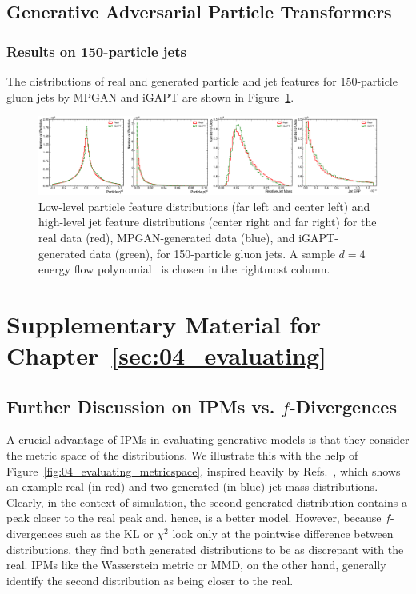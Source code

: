 \clearpage
\section{Generative Adversarial Particle Transformers}

\subsection{Results on 150-particle jets}
\label{app:04_gapt_150}

The distributions of real and generated particle and jet features for 150-particle gluon jets by MPGAN and iGAPT are shown in Figure~\ref{fig:04_gapt_feature_distributions_150}.

\begin{figure}[ht]
    \centering
    \includegraphics[width=\textwidth]{figures/04-ML4Sim/igapt/feature_distributions_150.pdf}
    \caption[Low-level particle feature distributions and high-level jet feature distributions for 150-particle gluon jets.]{Low-level particle feature distributions (far left and center left) and high-level jet feature distributions (center right and far right) for the real data (red), MPGAN-generated data (blue), and iGAPT-generated data (green), for 150-particle gluon jets.
    A sample $d = 4$ energy flow polynomial~\cite{Komiske:2017aww} is chosen in the rightmost column.
    }
    \label{fig:04_gapt_feature_distributions_150}
\end{figure}


\chapter{Supplementary Material for Chapter~\ref{sec:04_evaluating}}

\section{Further Discussion on IPMs vs. \texorpdfstring{$f$}{f}-Divergences}
\label{app:04_evaluating_metricspace}

A crucial advantage of IPMs in evaluating generative models is that they consider the metric space of the distributions.
We illustrate this with the help of Figure~\ref{fig:04_evaluating_metricspace}, inspired heavily by Refs.~\cite{gretton_talk, w1_stackoverflow}, which shows an example real (in red) and two generated (in blue) jet mass distributions.
Clearly, in the context of simulation, the second generated distribution contains a peak closer to the real peak and, hence, is a better model.
However, because $f$-divergences such as the KL or $\chi^2$ look only at the pointwise difference between distributions, they find both generated distributions to be as discrepant with the real.
IPMs like the Wasserstein metric or MMD, on the other hand, generally identify the second distribution as being closer to the real.

